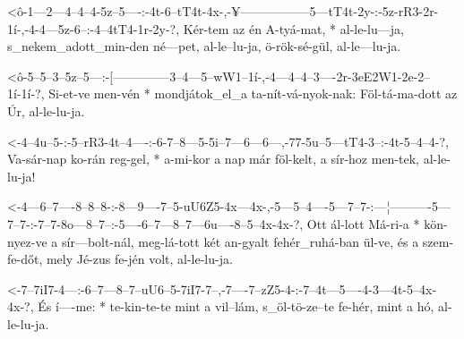 




  {<ô-1---2---4--4--4-5z--5----:-4t-6--tT4t-4x-,-¥-----------------5---tT4t-2y-:-5z-rR3-2r-1í-,-4-4---5z-6--:-4--4tT4-1r-2y-?,}
  {   Kér-tem az én A-tyá-mat, * al-le-lu---ja,  s_nekem_adott_min-den né---pet, al-le--lu-ja,  ö-rök-sé-gül, al-le---lu-ja.}


  {<ô-5--5--3--5z--5---:-[--------------3--4---5--wW1--1í-,-4---4--4--3----2r-3eE2W1-2e-2--1í-1í-?,}
  {   Si-et-ve men-vén * mondjátok_el_a ta-nít-vá-nyok-nak: Föl-tá-ma-dott az Úr,    al-le-lu-ja.}



  {<-4--4u--5-:-5--rR3-4t--4----:-6-7--8---5-5i--7---6---6---,-77-5u--5---tT4-3--:-4t-5--4--4-?,}
  {  Va-sár-nap ko-rán reg-gel, * a-mi-kor a nap már föl-kelt, a  sír-hoz men-tek, al-le-lu-ja!}


  {<-4---6--7----8--8--8-:-8---9----7--5-uU6Z5-4x---4x-,-5---5--4----5---7--7-:---¦----------5---7--7-:-7--7-8o---8--7--:-5----6--7---8--7---6u----8--5--4x-4x-?,}
  {  Ott ál-lott Má-ri-a * kön-nyez-ve a sír---bolt-nál, meg-lá-tott két an-gyalt fehér_ruhá-ban ül-ve, és a szem-fe-dőt, mely Jé-zus fe-jén volt, al-le-lu-ja.}



  {<-7--7iI7-4---:-6--7---8--7--uU6--5-7iI7-7--,-7----7--zZ5-4-:-7--4t---5----4-3---4t-5--4x-4x-?,}
  {  És í----me: * te-kin-te-te mint a vil--lám, s_öl-tö-ze--te  fe-hér, mint a hó, al-le-lu-ja.}

